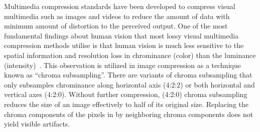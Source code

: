 Multimedia compression standards have been developed to compress visual multimedia such as images and videos to reduce the amount of data with minimum amount of distortion to the perceived output. One of the most fundamental findings about human vision that most lossy visual multimedia compression methods utilise is that human vision is much less sensitive to the spatial information and resolution loss in chrominance (color) than the luminance (intensity)~\cite{vorobyev2004ecology}. This observation is utilized in image compression as a technique known as ``chroma subsampling''. There are variants of chroma subsampling that only subsamples chrominance along horizontal axis (4:2:2) or both horizontal and vertical axes (4:2:0). Without further compression, (4:2:0) chroma subsampling reduces the size of an image effectively to half of its original size. Replacing the chroma components of the pixels in by neighboring chroma components does not yield visible artifacts.
